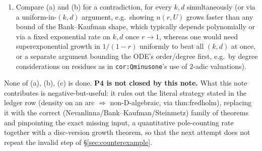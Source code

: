 \documentclass[11pt]{article}
\theoremstyle{remark}
\begin{document}
\begin{enumerate}
than entire coefficients) exists in the literature in citable form; \texttt{rem:disc} states this
honestly as unresolved.
\item[(c)] Compare (a) and (b) for a contradiction, for every $k,d$ simultaneously (or via a
uniform-in-$(k,d)$ argument, e.g.\ showing $n(r,U)$ grows faster than any bound of the Bank--Kaufman
shape, which typically depends polynomially or via a fixed exponential rate on $k,d$ once $r\to1$,
whereas one would need superexponential growth in $1/(1-r)$ uniformly to beat all $(k,d)$ at once,
or a separate argument bounding the ODE's order/degree first, e.g.\ by degree considerations on
residues as in \texttt{cor:Qminusone}'s use of $2$-adic valuations).
\end{enumerate}

None of (a), (b), (c) is done. \textbf{P4 is not closed by this note.} What this note contributes is
negative-but-useful: it rules out the literal strategy stated in the ledger row (density on an arc
$\Rightarrow$ non-D-algebraic, via thm:fredholm), replacing it with the correct
(Nevanlinna/Bank--Kaufman/Steinmetz) family of theorems and pinpointing the exact missing input, a
quantitative pole-counting rate together with a disc-version growth theorem, so that the next
attempt does not repeat the invalid step of \S\ref{sec:counterexample}.
\end{document}
